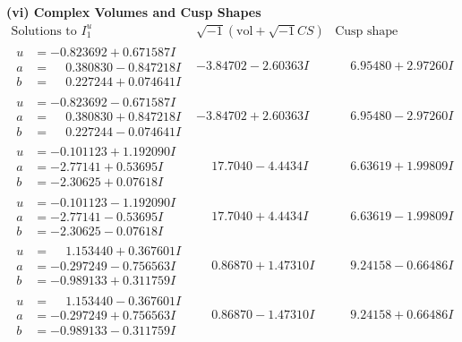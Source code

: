 \documentclass[1p]{elsarticle_modified}
\theoremstyle{definition}
\newcommand{\I}{\sqrt{-1}}
\begin{document}
\newpage\flushleft \textbf{(vi) Complex Volumes and Cusp Shapes}
$$\begin{array}{c|c|c}  
\text{Solutions to }I^u_{1}& \I (\text{vol} + \sqrt{-1}CS) & \text{Cusp shape}\\
 \hline 
\begin{aligned}
u &= -0.823692 + 0.671587 I \\
a &= \phantom{-}0.380830 - 0.847218 I \\
b &= \phantom{-}0.227244 + 0.074641 I\end{aligned}
 & -3.84702 - 2.60363 I & \phantom{-}6.95480 + 2.97260 I \\ \hline\begin{aligned}
u &= -0.823692 - 0.671587 I \\
a &= \phantom{-}0.380830 + 0.847218 I \\
b &= \phantom{-}0.227244 - 0.074641 I\end{aligned}
 & -3.84702 + 2.60363 I & \phantom{-}6.95480 - 2.97260 I \\ \hline\begin{aligned}
u &= -0.101123 + 1.192090 I \\
a &= -2.77141 + 0.53695 I \\
b &= -2.30625 + 0.07618 I\end{aligned}
 & \phantom{-}17.7040 - 4.4434 I & \phantom{-}6.63619 + 1.99809 I \\ \hline\begin{aligned}
u &= -0.101123 - 1.192090 I \\
a &= -2.77141 - 0.53695 I \\
b &= -2.30625 - 0.07618 I\end{aligned}
 & \phantom{-}17.7040 + 4.4434 I & \phantom{-}6.63619 - 1.99809 I \\ \hline\begin{aligned}
u &= \phantom{-}1.153440 + 0.367601 I \\
a &= -0.297249 - 0.756563 I \\
b &= -0.989133 + 0.311759 I\end{aligned}
 & \phantom{-}0.86870 + 1.47310 I & \phantom{-}9.24158 - 0.66486 I \\ \hline\begin{aligned}
u &= \phantom{-}1.153440 - 0.367601 I \\
a &= -0.297249 + 0.756563 I \\
b &= -0.989133 - 0.311759 I\end{aligned}
 & \phantom{-}0.86870 - 1.47310 I & \phantom{-}9.24158 + 0.66486 I \\ \hline\begin{aligned}

\end{aligned}
\end{array}$$
\end{document}
